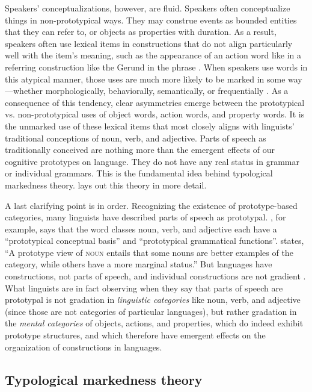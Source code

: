 Speakers' conceptualizations, however, are fluid. Speakers often conceptualize things in non-prototypical ways. They may construe events as bounded entities that they can refer to, or objects as properties with duration. As a result, speakers often use lexical items in constructions that do not align particularly well with the item's meaning, such as the appearance of an action word like  in a referring construction like the Gerund in the phrase . When speakers use words in this atypical manner, those uses are much more likely to be marked in some way—whether morphologically, behaviorally, semantically, or frequentially \parencite[§2.2]{Croft1991}. As a consequence of this tendency, clear asymmetries emerge between the prototypical vs. non-prototypical uses of object words, action words, and property words. It is the unmarked use of these lexical items that most closely aligns with linguists' traditional conceptions of noun, verb, and adjective. Parts of speech as traditionally conceived are nothing more than the emergent effects of our cognitive prototypes on language. They do not have any real status in grammar or individual grammars. This is the fundamental idea behind typological markedness theory.  lays out this theory in more detail.

A last clarifying point is in order. Recognizing the existence of prototype-based categories, many linguists have described parts of speech as prototypal. \textcite[1--2]{Dixon2004}, for example, says that the word classes noun, verb, and adjective each have a \enquote{prototypical conceptual basis} and \enquote{prototypical grammatical functions}. \textcite[217]{Taylor2003} states, \enquote{A prototype view of \textsc{noun} entails that some nouns are better examples of the category, while others have a more marginal status.} But languages have constructions, not parts of speech, and individual constructions are not gradient \parencite{Croft2007}. What linguists are in fact observing when they say that parts of speech are prototypal is not gradation in \emph{linguistic categories} like noun, verb, and adjective (since those are not categories of particular languages), but rather gradation in the \emph{mental categories} of objects, actions, and properties, which do indeed exhibit prototype structures, and which therefore have emergent effects on the organization of constructions in languages.

\subsection{Typological markedness theory}
\label{sec:2.4.2}

